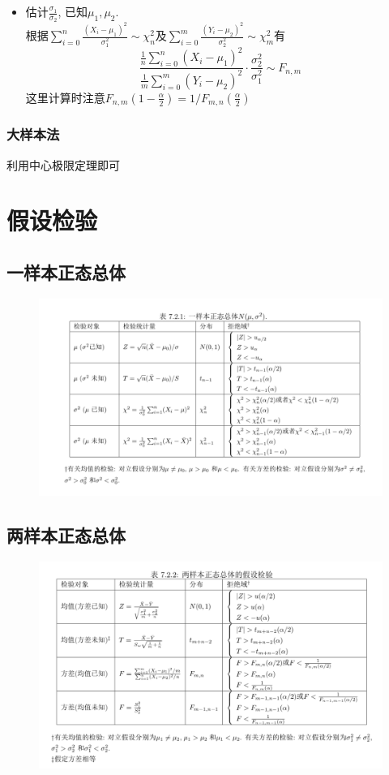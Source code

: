 \documentclass[UTF8]{article}
\begin{document}
\begin{enumerate}
\begin{itemize}
		\item 估计$\frac{\sigma_1}{\sigma_2}$, 已知$\mu_1, \mu_2$.\\
		根据$\sum\limits_{i=0}^n\frac{(X_i-\mu_1)^2}{\sigma_1^2} \sim \chi_{n}^2$及$\sum\limits_{i=0}^m\frac{(Y_i-\mu_2)^2}{\sigma_2^2} \sim \chi_{m}^2$有
		$$\frac{\frac{1}{n}\sum\limits_{i=0}^n(X_i-\mu_1)^2}{\frac{1}{m}\sum\limits_{i=0}^m(Y_i-\mu_2)^2}\cdot\frac{\sigma_2^2}{\sigma_1^2} \sim F_{n, m}$$
		这里计算时注意$F_{n, m}(1-\frac{\alpha}{2})=1/F_{m, n}(\frac{\alpha}{2})$
		
	\end{itemize}
\end{enumerate}
\subsubsection{大样本法}
利用中心极限定理即可

\section{假设检验}
\subsection{一样本正态总体}
\begin{figure}[H]
	\centering
	\includegraphics[width=\linewidth]{one_sample_norm.png}
\end{figure}
\subsection{两样本正态总体}
\begin{figure}[H]
	\centering
	\includegraphics[width=\linewidth]{two_sample_norm.png}
\end{figure}
\end{document}
